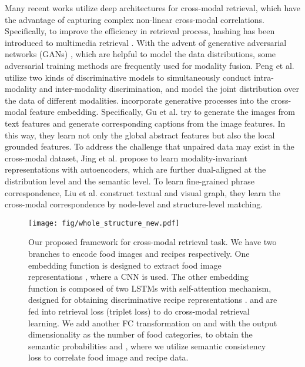 \documentclass[journal]{IEEEtran}
\begin{document}
Many recent works \cite{li2018deep,li2020weakly,jin2020deep} utilize deep architectures for cross-modal retrieval, which have the advantage of capturing complex non-linear cross-modal correlations. Specifically, to improve the efficiency in retrieval process, hashing has been introduced to multimedia retrieval \cite{li2020weakly,jin2020deep}. With the advent of generative adversarial networks (GANs) \cite{goodfellow2014generative}, which are helpful to model the data distributions, some adversarial training methods \cite{gu2017look, peng2017cm, ghasedi2018unsupervised} are frequently used for modality fusion. Peng et al. \cite{peng2017cm} utilize two kinds of discriminative models to simultaneously conduct intra-modality and inter-modality discrimination, and model the joint distribution over the data of different modalities. \cite{gu2017look,jing2020incomplete} incorporate generative processes into the cross-modal feature embedding. Specifically, Gu et al. \cite{gu2017look} try to generate the images from text features and generate corresponding captions from the image features. In this way, they learn not only the global abstract features but also the local grounded features. To address the challenge that unpaired data may exist in the cross-modal dataset, Jing et al. \cite{jing2020incomplete} propose to learn modality-invariant representations with autoencoders, which are further dual-aligned at the distribution level and the semantic level. To learn fine-grained phrase correspondence, Liu et al. \cite{liu2020graph} construct textual and visual graph, they learn the cross-modal correspondence by node-level and structure-level matching.

\begin{figure*}[htb]
\begin{center}
\texttt{[image: fig/whole\_structure\_new.pdf]}
\end{center}
   \caption{Our proposed framework for cross-modal retrieval task. We have two branches to encode food images and recipes respectively. One embedding function  is designed to extract food image representations , where a CNN is used. The other embedding function  is composed of two LSTMs with self-attention mechanism, designed for obtaining discriminative recipe representations .  and  are fed into retrieval loss (triplet loss)  to do cross-modal retrieval learning. We add another FC transformation on  and  with the output dimensionality as the number of food categories, to obtain the semantic probabilities  and , where we utilize semantic consistency loss  to correlate food image and recipe data.}
\label{fig:pipeline}
\end{figure*}
\end{document}
